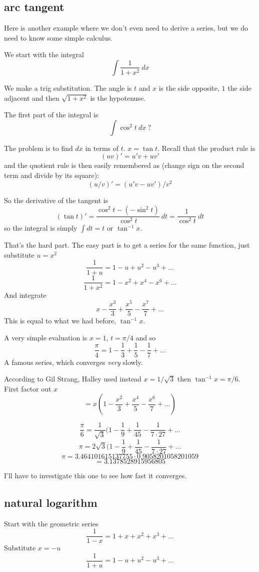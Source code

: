 \documentclass[11pt, oneside]{article}
\begin{document}
\subsection*{arc tangent}
Here is another example where we don't even need to derive a series, but we do need to know some simple calculus.

We start with the integral
\[ \int \frac{1}{1 + x^2} \ dx \]

We make a trig substitution.  The angle is $t$ and $x$ is the side opposite, $1$ the side adjacent and then $\sqrt{1 + x^2}$ is the hypotenuse.

The first part of the integral is
\[ \int \cos^2 t  \ dx \ \text{?} \]

The problem is to find $dx$ in terms of $t$.  $x = \tan t$.  Recall that the product rule is
\[ (uv)' = u'v + uv' \]
and the quotient rule is then easily remembered as (change sign on the second term and divide by its square):
\[ (u/v)' = (u'v - uv')/v^2 \]

So the derivative of the tangent is 
\[ (\tan t)' = \frac{ \cos^2 t - (- \sin^2 t)}{\cos^2 t} \ dt = \frac{1}{\cos^2 t} \ dt \]
so the integral is simply $\int dt = t$ or $\tan^{-1} x$.

That's the hard part.  The easy part is to get a series for the same function, just substitute $u = x^2$ 
\[ \frac{1}{1 + u} = 1 - u + u^2 - u^3 + \dots \]
\[ \frac{1}{1 + x^2} = 1 - x^2 + x^4 - x^6 + \dots \]
And integrate
\[ x - \frac{x^3}{3} + \frac{x^5}{5} - \frac{x^7}{7} + \dots \]
This is equal to what we had before, $\tan^{-1} x$.

A very simple evaluation is $x = 1$, $t = \pi/4$ and so
\[ \frac{\pi}{4} = 1 - \frac{1}{3} + \frac{1}{5}  - \frac{1}{7} + \dots \]
A famous series, which converges \emph{very} slowly.

According to Gil Strang, Halley used instead $x = 1/\sqrt{3}$ then $\tan^{-1} x = \pi/6$.  First factor out $x$
\[ = x (1 - \frac{x^2}{3} + \frac{x^4}{5} - \frac{x^6}{7} + \dots ) \]


\[ \frac{\pi}{6} = \frac{1}{\sqrt{3}} (1 - \frac{1}{9} + \frac{1}{45} - \frac{1}{7 \cdot 27} + \dots \]
\[ \pi = 2 \sqrt{3} (1 - \frac{1}{9} + \frac{1}{45} - \frac{1}{7 \cdot 27} + \dots \]
\[ \pi = 3.464101615137755 \cdot 0.9058201058201059 \]
\[ = 3.1378528915956805 \]

I'll have to investigate this one to see how fast it converges.

\subsection*{natural logarithm}
Start with the geometric series
\[ \frac{1}{1 - x} = 1 + x + x^2 + x^3 + \dots \]
Substitute $x = -u$
\[ \frac{1}{1 + u} = 1 - u + u^2 - u^3 + \dots \]
\end{document}
